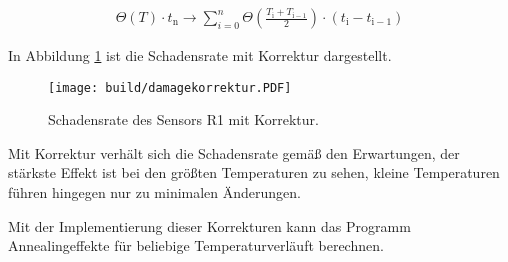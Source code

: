 \begin{align}
  \Theta(T) \cdot t_{\mathrm{n}} \rightarrow \sum_{i=0}^n   \Theta \left(\frac{T_{\mathrm{i}} +T_{\mathrm{i-1}}}{2}\right) \cdot  (t_{\mathrm{i}} - t_{\mathrm{i-1}})
\end{align}

In Abbildung \ref{fig:korrektur_damage} ist die Schadensrate mit Korrektur
dargestellt.

\begin{figure}
  \centering
    \texttt{[image: build/damagekorrektur.PDF]}
\caption{Schadensrate des Sensors R1 mit Korrektur.}
\label{fig:korrektur_damage}
\end{figure}


Mit Korrektur verhält sich die Schadensrate gemäß den Erwartungen, der stärkste
Effekt ist bei den größten Temperaturen zu sehen, kleine Temperaturen führen hingegen
nur zu minimalen Änderungen.

Mit der Implementierung dieser Korrekturen kann das Programm Annealingeffekte für
beliebige Temperaturverläuft berechnen.



